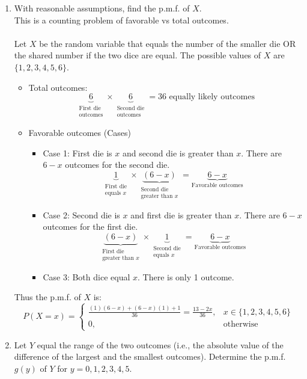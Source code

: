 ﻿\documentclass[12pt]{article}
\begin{document}
\begin{enumerate}
    \item[(a)] With reasonable assumptions, find the p.m.f. of $X$.\\
    This is a counting problem of favorable vs total outcomes.\\\\
    Let $X$ be the random variable that equals the number of the smaller die OR the shared number if the two dice are equal. The possible values of $X$ are $\{1,2,3,4,5,6\}$. 
    \begin{itemize}
        \item Total outcomes: 
        \[
\underbrace{6}_{\substack{\text{First die}\\\text{outcomes}}}
\times
\underbrace{6}_{\substack{\text{Second die}\\\text{outcomes}}}
=36\text{ equally likely outcomes}
\]
\item Favorable outcomes (Cases)
\begin{itemize}
    \item Case 1: First die is $x$ and second die is greater than $x$. There are $6-x$ outcomes for the second die.
    \[
\underbrace{1}_{\substack{\text{First die}\\\text{equals }x}}
\times
\underbrace{(6-x)}_{\substack{\text{Second die}\\\text{greater than }x}}
=
\underbrace{6-x}_{\text{Favorable outcomes}}
\]
    \item Case 2: Second die is $x$ and first die is greater than $x$. There are $6-x$ outcomes for the first die.
    \[\underbrace{(6-x)}_{\substack{\text{First die}\\\text{greater than }x}}
\times
\underbrace{1}_{\substack{\text{Second die}\\\text{equals }x}}
=
\underbrace{6-x}_{\text{Favorable outcomes}}
\]
\item Case 3: Both dice equal $x$. There is only 1 outcome.
\end{itemize}
    \end{itemize}
    Thus the p.m.f. of $X$ is:
\[
P(X=x)=
\begin{cases}
\displaystyle \frac{(1)(6-x)+(6-x)(1)+1}{36}
=\frac{13-2x}{36}, & x\in\{1,2,3,4,5,6\}\\[8pt]
0, & \text{otherwise}
\end{cases}
\]
    \item[(b)] Let $Y$ equal the range of the two outcomes (i.e., the absolute value of the difference of the largest and the smallest outcomes). Determine the p.m.f. $g(y)$ of $Y$ for $y=0,1,2,3,4,5$.\\\\

\end{enumerate}
\end{document}
